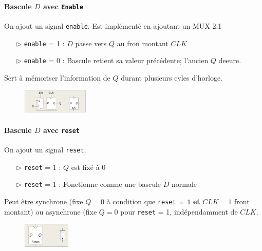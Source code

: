 \documentclass{report}
\begin{document}
\begin{multicols*}{3}
    \paragraph{Bascule $D$ avec \texttt{Enable}}
    On ajout un signal \texttt{enable}. Est implémenté en ajoutant un MUX 2:1 
    \begin{itemize}
      \item [$\rhd$ ] \texttt{enable} = 1 : $D$ passe vers $Q$ au fron montant $CLK$  
      \item [$\rhd$ ] \texttt{enable} = 0 : Bascule retient sa valeur précédente; 
        l'ancien $Q$ deeure.
    \end{itemize}
    Sert à mémoriser l'information de $Q$ durant plusieurs cyles d'horloge. 


    \begin{figure}[H]
      \begin{center}
        \includegraphics[width=0.28\textwidth]{BasculeDEnable.png}
      \end{center}
    \end{figure}


    \paragraph{Bascule $D$ avec \texttt{reset}}
    On ajout un signal \texttt{reset}. 
    \begin{itemize}
      \item [$\rhd$ ] \texttt{reset} = 1 : $Q$ est fixé à $0$ 
      \item [$\rhd$ ] \texttt{reset} = 1 : Fonctionne comme une bascule 
        $D$ normale
    \end{itemize}
    Peut être synchrone (fixe $Q = 0$ à condition que 
    \texttt{reset = 1} \textbf{et} $CLK = 1$ front montant) ou 
    asynchrone (fixe $Q = 0$ pour \texttt{reset} = 1, 
    indépendamment de $CLK$. 


    \begin{figure}[H]
      \begin{center}
        \includegraphics[width=0.2\textwidth]{BasculeDReset.png}
      \end{center}
    \end{figure}



\end{multicols*}
\end{document}
